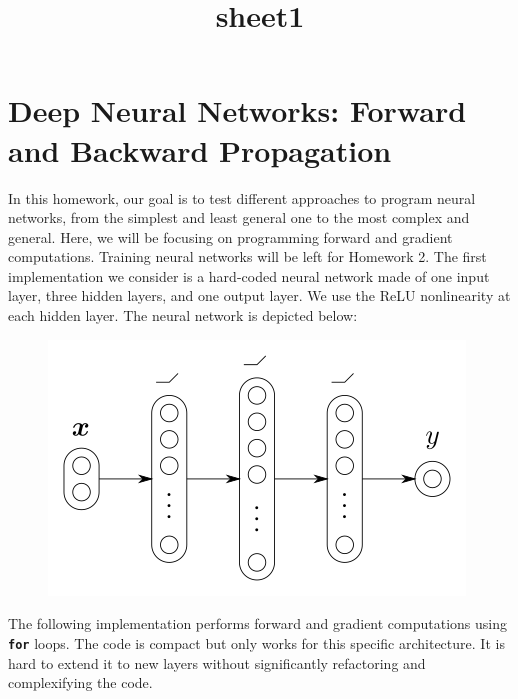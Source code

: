 \documentclass[11pt]{article}
\title{sheet1}
\makeatletter
\def\maxwidth{\ifdim\Gin@nat@width>\linewidth\linewidth
    \else\Gin@nat@width\fi}
\let\Oldincludegraphics\includegraphics
\renewcommand{\includegraphics}[1]{\Oldincludegraphics[width=.8\maxwidth]{#1}}
\makeatother
\begin{document}
    
    
    \maketitle
    
    

    
    \section{Deep Neural Networks: Forward and Backward
Propagation}\label{deep-neural-networks-forward-and-backward-propagation}

In this homework, our goal is to test different approaches to program
neural networks, from the simplest and least general one to the most
complex and general. Here, we will be focusing on programming forward
and gradient computations. Training neural networks will be left for
Homework 2. The first implementation we consider is a hard-coded neural
network made of one input layer, three hidden layers, and one output
layer. We use the ReLU nonlinearity at each hidden layer. The neural
network is depicted below:

\begin{figure}
\centering
\includegraphics{net.svg.png}
\caption{}
\end{figure}

The following implementation performs forward and gradient computations
using \textbf{\texttt{for}} loops. The code is compact but only works
for this specific architecture. It is hard to extend it to new layers
without significantly refactoring and complexifying the code.
\end{document}
